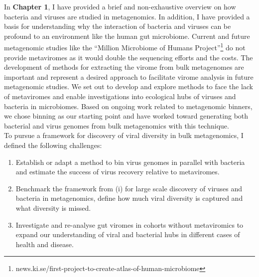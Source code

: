 In \textbf{Chapter 1}, I have provided a brief and non-exhaustive overview on how bacteria and viruses are studied in metagenomics. In addition, I have provided a basis for understanding why the interaction of bacteria and viruses can be profound to an environment like the human gut microbiome. Current and future metagenomic studies like the “Million Microbiome of Humans Project”\footnote{news.ki.se/first-project-to-create-atlas-of-human-microbiome} do not provide metaviromes as it would double the sequencing efforts and the costs. The development of methods for extracting the virome from bulk metagenomes are important and represent a desired approach to facilitate virome analysis in future metagenomic studies. We set out to develop and explore methods to face the lack of metaviromes and enable investigations into ecological hubs of viruses and bacteria in microbiomes. Based on ongoing work related to metagenomic binners, we chose binning as our starting point and have worked toward generating both bacterial and virus genomes from bulk metagenomics with this technique.\\

\noindent
To pursue a framework for discovery of viral diversity in bulk metagenomics, I defined the following challenges:
\begin{enumerate}
    \item Establish or adapt a method to bin virus genomes in parallel with bacteria and estimate the success of virus recovery relative to metaviromes.
    \item Benchmark the framework from (i) for large scale discovery of viruses and bacteria in metagenomics, define how much viral diversity is captured and what diversity is missed.
    \item Investigate and re-analyse gut viromes in cohorts without metaviromics to expand our understanding of viral and bacterial hubs in different cases of health and disease. 
\end{enumerate}

